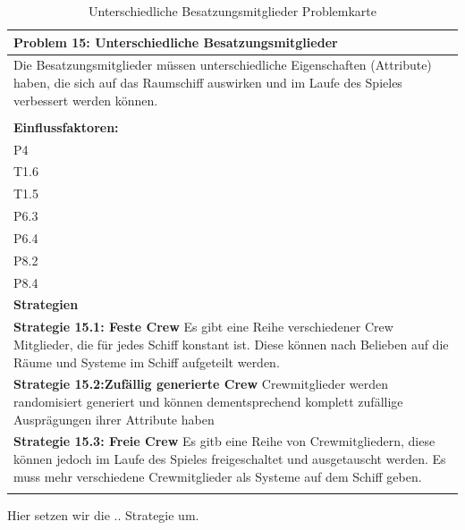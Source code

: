 \documentclass[fontsize=12pt,paper=a4,twoside]{scrartcl}
\begin{document}
\begin{table}[H]
    \centering
    \begin{tabular}{|p{15cm}|}
    \hline
          \textbf{Problem 15: Unterschiedliche Besatzungsmitglieder}  \\ \hline
	Die Besatzungsmitglieder müssen unterschiedliche Eigenschaften (Attribute) haben, die sich auf das Raumschiff auswirken und im Laufe des Spieles verbessert werden können. \\
         \\ \hline
          \textbf{Einflussfaktoren: } \\
	P4 \\
	T1.6 \\
	T1.5 \\
	P6.3 \\
	P6.4 \\
	P8.2 \\
	P8.4 \\
          \hline
          \textbf{Strategien} \\ \hline
            {}          
           \label{strategie:15.1}     
          \textbf{Strategie 15.1: Feste Crew} Es gibt eine Reihe verschiedener Crew Mitglieder, die für jedes Schiff konstant ist. Diese können nach Belieben auf die Räume und Systeme im Schiff aufgeteilt werden. \\        
  {}          
           \label{strategie:15.2}              
          \textbf{Strategie 15.2:Zufällig generierte Crew} Crewmitglieder werden randomisiert generiert und können dementsprechend komplett zufällige Ausprägungen ihrer Attribute haben  \\
	 {}          
           \label{strategie:15.3}     
          \textbf{Strategie 15.3: Freie Crew} Es gitb eine Reihe von Crewmitgliedern, diese können jedoch im Laufe des Spieles freigeschaltet und ausgetauscht werden. Es muss mehr verschiedene Crewmitglieder als Systeme auf dem Schiff geben. \\ 
	 \\ \hline
    \end{tabular}

    \caption{Unterschiedliche Besatzungsmitglieder Problemkarte}
    \label{tab:ProblemKarte15}
\end{table}
Hier setzen wir die .. Strategie um.  \\
\end{document}
